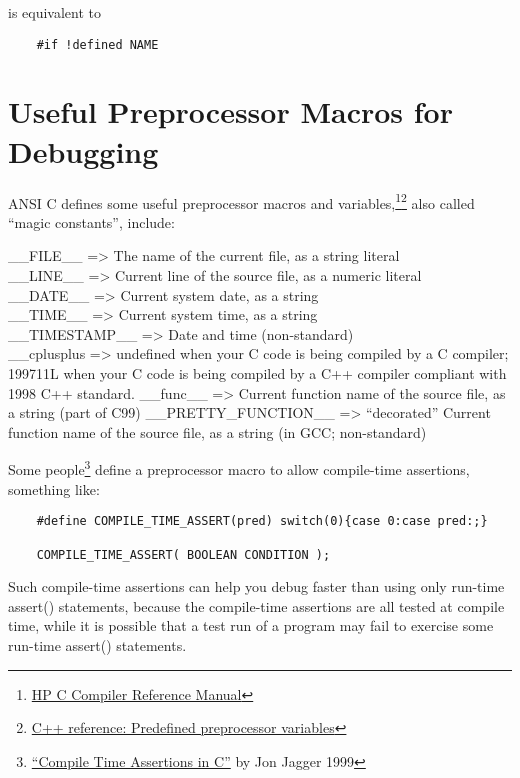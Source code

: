 is equivalent to

\begin{verbatim}
	#if !defined NAME
\end{verbatim}

\section{Useful Preprocessor Macros for Debugging}
ANSI C defines some useful preprocessor macros and variables,\footnote{
\href{http://docs.hp.com/en/B3901-90003/ch07s04.html}{HP C Compiler Reference Manual}
}\footnote{
\href{http://www.cppreference.com/wiki/preprocessor/preprocessor_vars}{C++ reference: Predefined preprocessor variables}
}
also called ``magic constants'', include:

\_\_FILE\_\_ =\textgreater{} The name of the current file, as a string literal\\
\_\_LINE\_\_ =\textgreater{} Current line of the source file, as a numeric literal\\
\_\_DATE\_\_ =\textgreater{} Current system date, as a string\\
\_\_TIME\_\_ =\textgreater{} Current system time, as a string\\
\_\_TIMESTAMP\_\_ =\textgreater{} Date and time (non-standard)\\
\_\_cplusplus =\textgreater{} undefined when your C code is being compiled by a C compiler; 199711L when your C code is being compiled by a C++ compiler compliant with 1998 C++ standard.
\_\_func\_\_ =\textgreater{} Current function name of the source file, as a string (part of C99)
\_\_PRETTY\_FUNCTION\_\_ =\textgreater{} ``decorated'' Current function name of the source file, as a string (in GCC; non-standard)

Some people\footnote{
\href{http://www.jaggersoft.com/pubs/CVu11_3.html}{``Compile Time Assertions in C''} by Jon Jagger 1999
}
define a preprocessor macro to allow compile-time assertions, something like:

\begin{verbatim}
	#define COMPILE_TIME_ASSERT(pred) switch(0){case 0:case pred:;}
	
	COMPILE_TIME_ASSERT( BOOLEAN CONDITION );
\end{verbatim}

Such compile-time assertions can help you debug faster than using only run-time assert() statements,
because the compile-time assertions are all tested at compile time,
while it is possible that a test run of a program may fail to exercise some run-time assert() statements.

